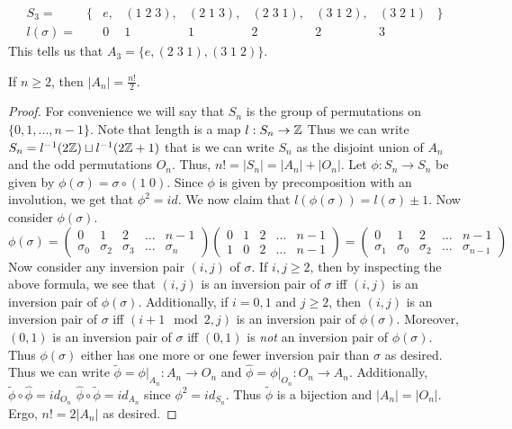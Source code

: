 \begin{example}
    \[
        \begin{array}{rrccccccl}
            S_3=&\{&e,&(1\;2\;3),&(2\;1\;3),&(2\;3\;1),&(3\;1\;2),&(3\;2\;1)&\}\\
            l(\sigma)=&&0&1&1&2&2&3
        \end{array}
    \]
    This tells us that $A_3=\{e,(2\;3\;1),(3\;1\;2)\}$.
\end{example}

\begin{theorem}
    If $n\geq 2$, then $|A_n|=\frac{n!}{2}$.
\end{theorem}
\begin{proof}
    For convenience we will say that $S_n$ is the group of permutations on $\{0,1,\ldots,n-1\}$.
    Note that length is a map $l:S_n\to\mathbb{Z}$ Thus we can write $S_n=l^{-1}(2\mathbb{Z})\sqcup l^{-1}(2\mathbb{Z}+1)$ that is
    we can write $S_n$ as the disjoint union of $A_n$ and the odd permutations $O_n$. Thus, $n!=|S_n|=|A_n|+|O_n|$.
    Let $\phi:S_n\to S_n$ be given by $\phi(\sigma)=\sigma\circ(1\;0)$. Since $\phi$ is given by precomposition with an
    involution, we get that $\phi^2=id$. We now claim that $l(\phi(\sigma))=l(\sigma)\pm 1$. Now consider $\phi(\sigma)$.
    \[
        \phi(\sigma)=
        \begin{pmatrix}
            0&1&2&\ldots&n-1\\
            \sigma_0&\sigma_2&\sigma_3&\ldots&\sigma_n
        \end{pmatrix}
        \begin{pmatrix}
            0&1&2&\ldots&n-1\\
            1&0&2&\ldots&n-1
        \end{pmatrix}
        =
        \begin{pmatrix}
            0&1&2&\ldots&n-1\\
            \sigma_1&\sigma_0&\sigma_2&\ldots&\sigma_{n-1}
        \end{pmatrix}
    \]
    Now consider any inversion pair $(i,j)$ of $\sigma$.
    If $i,j\geq 2$, then by inspecting the above formula, we see that $(i,j)$ is an inversion pair of $\sigma$ iff $(i,j)$
    is an inversion pair of $\phi(\sigma)$. Additionally, if $i=0,1$ and $j\geq2$, then $(i,j)$ is an inversion pair of
    $\sigma$ iff $(i+1\mod 2,j)$ is an inversion pair of $\phi(\sigma)$. Moreover, $(0,1)$ is an inversion pair of $\sigma$
    iff $(0,1)$ is \textit{not} an inversion pair of $\phi(\sigma)$. Thus $\phi(\sigma)$ either has one more or one fewer
    inversion pair than $\sigma$ as desired. Thus we can write $\widetilde{\phi}=\phi|_{A_n}:A_n\to O_n$ and
    $\widehat{\phi}=\phi|_{O_n}:O_n\to A_n$. Additionally,
    $\widetilde{\phi}\circ\widehat{\phi}=id_{O_n}$ $\widehat{\phi}\circ\widetilde{\phi}=id_{A_n}$ since $\phi^2=id_{S_n}$.
    Thus $\widetilde{\phi}$ is a bijection and $|A_n|=|O_n|$. Ergo, $n!=2|A_n|$ as desired.
\end{proof}


